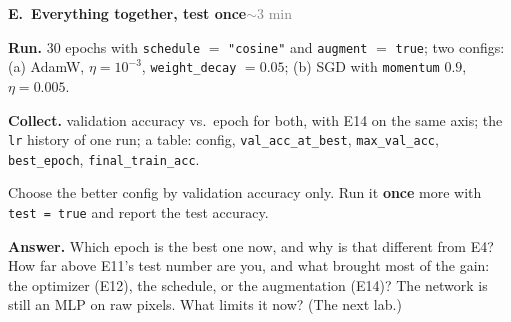 \documentclass[11pt]{article}
\newcommand{\code}[1]{\texttt{#1}}
\newcounter{exp}
\newenvironment{experiment}[2]{\refstepcounter{exp}\par\medskip
  \textbf{\textcolor{aiblue}{E\theexp.\ #1}}\hfill{\small\textcolor{gray}{#2}}\par}{\par}
\newcommand{\run}[1]{\textbf{Run.} #1\par}
\newcommand{\collect}[1]{\textbf{Collect.} #1\par}
\newcommand{\answer}[1]{\textbf{Answer.} #1\par}
\begin{document}
\begin{experiment}{Everything together, test once}{$\sim$3 min}
\run{30 epochs with \code{schedule} $=$ \code{"cosine"} and \code{augment} $=$ \code{true}; two configs: (a) AdamW, $\eta=10^{-3}$, \code{weight\_decay} $=0.05$; (b) SGD with \code{momentum} $0.9$, $\eta=0.005$.}
\collect{validation accuracy vs.\ epoch for both, with E14 on the same axis; the \code{lr} history of one run; a table: config, \code{val\_acc\_at\_best}, \code{max\_val\_acc}, \code{best\_epoch}, \code{final\_train\_acc}.}
Choose the better config by validation accuracy only. Run it \textbf{once} more with \code{test = true} and report the test accuracy.\par
\answer{Which epoch is the best one now, and why is that different from E4? How far above E11's test number are you, and what brought most of the gain: the optimizer (E12), the schedule, or the augmentation (E14)? The network is still an MLP on raw pixels. What limits it now? (The next lab.)}
\end{experiment}
\end{document}
